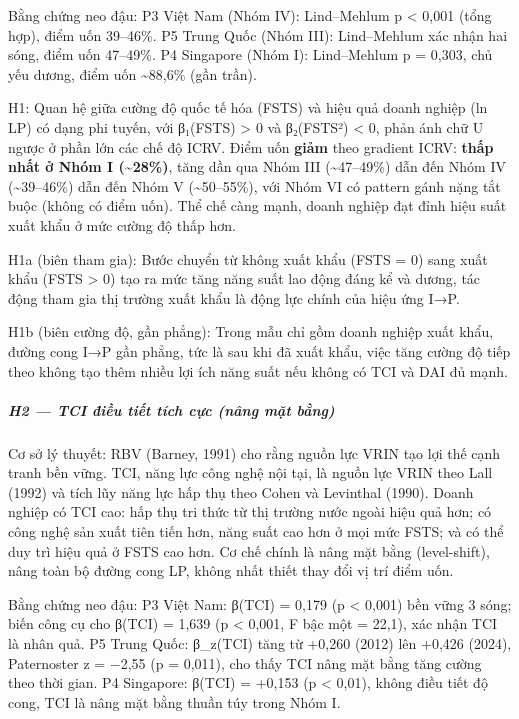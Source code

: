 \documentclass[12pt,a4paper]{article}
\begin{document}
Bằng chứng neo đậu: P3 Việt Nam (Nhóm IV): Lind--Mehlum p \textless{}
0,001 (tổng hợp), điểm uốn 39--46\%. P5 Trung Quốc (Nhóm III):
Lind--Mehlum xác nhận hai sóng, điểm uốn 47--49\%. P4 Singapore (Nhóm
I): Lind--Mehlum p = 0,303, chủ yếu dương, điểm uốn
\textasciitilde88,6\% (gần trần).

H1: Quan hệ giữa cường độ quốc tế hóa (FSTS) và hiệu quả doanh nghiệp
(ln LP) có dạng phi tuyến, với β₁(FSTS) \textgreater{} 0 và β₂(FSTS²)
\textless{} 0, phản ánh chữ U ngược ở phần lớn các chế độ ICRV. Điểm uốn
\textbf{giảm} theo gradient ICRV: \textbf{thấp nhất ở Nhóm I
(\textasciitilde28\%)}, tăng dần qua Nhóm III (\textasciitilde47--49\%)
dẫn đến Nhóm IV (\textasciitilde39--46\%) dẫn đến Nhóm V
(\textasciitilde50--55\%), với Nhóm VI có pattern gánh nặng tắt buộc
(không có điểm uốn). Thể chế càng mạnh, doanh nghiệp đạt đỉnh hiệu suất
xuất khẩu ở mức cường độ thấp hơn.

H1a (biên tham gia): Bước chuyển từ không xuất khẩu (FSTS = 0) sang xuất
khẩu (FSTS \textgreater{} 0) tạo ra mức tăng năng suất lao động đáng kể
và dương, tác động tham gia thị trường xuất khẩu là động lực chính của
hiệu ứng I→P.

H1b (biên cường độ, gần phẳng): Trong mẫu chỉ gồm doanh nghiệp xuất
khẩu, đường cong I→P gần phẳng, tức là sau khi đã xuất khẩu, việc tăng
cường độ tiếp theo không tạo thêm nhiều lợi ích năng suất nếu không có
TCI và DAI đủ mạnh.

\hypertarget{h2--tci-ux111iux1ec1u-tiux1ebft-tuxedch-cux1ef1c-nuxe2ng-mux1eb7t-bux1eb1ng}{%
\subparagraph{H2 --- TCI điều tiết tích cực (nâng mặt
bằng)}\label{h2--tci-ux111iux1ec1u-tiux1ebft-tuxedch-cux1ef1c-nuxe2ng-mux1eb7t-bux1eb1ng}}

Cơ sở lý thuyết: RBV (Barney, 1991) cho rằng nguồn lực VRIN tạo lợi thế
cạnh tranh bền vững. TCI, năng lực công nghệ nội tại, là nguồn lực VRIN
theo Lall (1992) và tích lũy năng lực hấp thụ theo Cohen và Levinthal
(1990). Doanh nghiệp có TCI cao: hấp thụ tri thức từ thị trường nước
ngoài hiệu quả hơn; có công nghệ sản xuất tiên tiến hơn, năng suất cao
hơn ở mọi mức FSTS; và có thể duy trì hiệu quả ở FSTS cao hơn. Cơ chế
chính là nâng mặt bằng (level-shift), nâng toàn bộ đường cong LP, không
nhất thiết thay đổi vị trí điểm uốn.

Bằng chứng neo đậu: P3 Việt Nam: β(TCI) = 0,179 (p \textless{} 0,001)
bền vững 3 sóng; biến công cụ cho β(TCI) = 1,639 (p \textless{} 0,001, F
bậc một = 22,1), xác nhận TCI là nhân quả. P5 Trung Quốc: β\_z(TCI) tăng
từ +0,260 (2012) lên +0,426 (2024), Paternoster z = −2,55 (p = 0,011),
cho thấy TCI nâng mặt bằng tăng cường theo thời gian. P4 Singapore:
β(TCI) = +0,153 (p \textless{} 0,01), không điều tiết độ cong, TCI là
nâng mặt bằng thuần túy trong Nhóm I.
\end{document}
